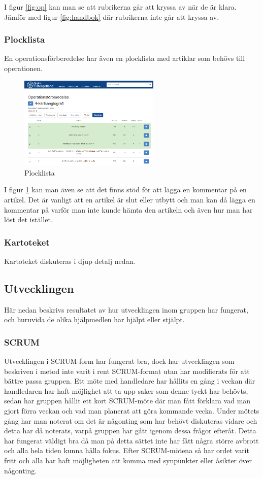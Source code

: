 I figur \ref{fig:op} kan man se att rubrikerna går att kryssa av när de är klara. Jämför med figur \ref{fig:handbok} där rubrikerna inte går att kryssa av.

\subsubsection{Plocklista}
En operationsförberedelse har även en plocklista med artiklar som behövs till operationen.

\begin{figure}
  \centering
  \includegraphics[width=0.6\textwidth]{images/site/plocklista}
  \caption{Plocklista}
  \label{fig:plocklista}
\end{figure}

I figur \ref{fig:plocklista} kan man även se att det finns stöd för att lägga en kommentar på en artikel.
Det är vanligt att en artikel är slut eller utbytt och man kan då lägga en kommentar på varför man inte kunde hämta den artikeln och även hur man har löst det istället.

\subsubsection{Kartoteket}
Kartoteket diskuteras i djup detalj nedan.

\subsection{Utvecklingen}
Här nedan beskrivs resultatet av hur utvecklingen inom gruppen har fungerat, och huruvida de olika hjälpmedlen har hjälpt eller stjälpt.

\subsubsection{SCRUM}
Utvecklingen i SCRUM-form har fungerat bra, dock har utvecklingen som beskriven i metod inte varit i rent SCRUM-format utan har modifierats för att bättre passa gruppen. Ett möte med handledare har hållits en gång i veckan där handledaren har haft möjlighet att ta upp saker som denne tyckt har behövts, sedan har gruppen hållit ett kort SCRUM-möte där man fått förklara vad man gjort förra veckan och vad man planerat att göra kommande vecka. Under mötets gång har man noterat om det är någonting som har behövt diskuteras vidare och detta har då noterats, varpå gruppen har gått igenom dessa frågor efteråt. Detta har fungerat väldigt bra då man på detta sättet inte har fått några större avbrott och alla hela tiden kunna hålla fokus. Efter SCRUM-mötena så har ordet varit fritt och alla har haft möjligheten att komma med synpunkter eller åsikter över någonting.

